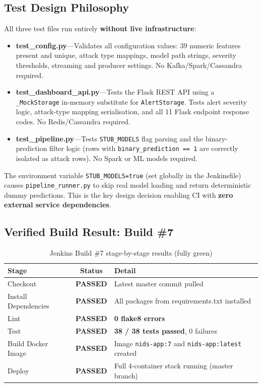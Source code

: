 \documentclass[12pt,a4paper]{report}
\begin{document}
\subsection{Test Design Philosophy}
All three test files run entirely \textbf{without live infrastructure}:
\begin{itemize}
  \item \textbf{test\_config.py}---Validates all configuration values:
        39 numeric features present and unique, attack type mappings, model
        path strings, severity thresholds, streaming and producer settings.
        No Kafka/Spark/Cassandra required.
  \item \textbf{test\_dashboard\_api.py}---Tests the Flask REST API using a
        \texttt{\_MockStorage} in-memory substitute for
        \texttt{AlertStorage}.  Tests alert severity logic, attack-type
        mapping serialisation, and all 11 Flask endpoint response codes.
        No Redis/Cassandra required.
  \item \textbf{test\_pipeline.py}---Tests \texttt{STUB\_MODELS} flag
        parsing and the binary-prediction filter logic (rows with
        \texttt{binary\_prediction~==~1} are correctly isolated as attack
        rows).  No Spark or ML models required.
\end{itemize}

The environment variable \texttt{STUB\_MODELS=true} (set globally in the
Jenkinsfile) causes \texttt{pipeline\_runner.py} to skip real model loading
and return deterministic dummy predictions.  This is the key design decision
enabling CI with \textbf{zero external service dependencies}.

\subsection{Verified Build Result: Build \#7}

\begin{table}[H]
  \centering
  \caption{Jenkins Build \#7 stage-by-stage results (fully green)}
  \label{tab:build7}
  \begin{tabular}{lcl}
    \toprule
    \textbf{Stage}           & \textbf{Status} & \textbf{Detail} \\
    \midrule
    Checkout                 & \textbf{PASSED} &
      Latest master commit pulled \\
    Install Dependencies     & \textbf{PASSED} &
      All packages from requirements.txt installed \\
    Lint                     & \textbf{PASSED} &
      \textbf{0 flake8 errors} \\
    Test                     & \textbf{PASSED} &
      \textbf{38 / 38 tests passed}, 0 failures \\
    Build Docker Image       & \textbf{PASSED} &
      Image \texttt{nids-app:7} and \texttt{nids-app:latest} created \\
    Deploy                   & \textbf{PASSED} &
      Full 4-container stack running (master branch) \\
    \bottomrule
  \end{tabular}
\end{table}
\end{document}
